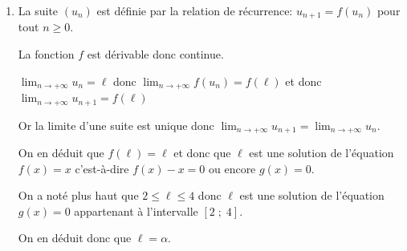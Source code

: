 \documentclass[10pt]{article}
\providecommand{\ds}{\displaystyle}
\begin{document}
\begin{enumerate}
Donc, d'après le corollaire du théorème des valeurs intermédiaires, on peut conclure que l'équation $g(x)=0$ admet une solution unique dans l'intervalle $[2\;;\;4]$.

On appelle $\alpha$ cette solution. À la calculatrice on trouve $\alpha\approx 3,78$.


\item
La suite $(u_n)$ est définie par la relation de récurrence: $u_{n+1}=f\left (u_n\right )$ pour tout $n\geqslant 0$.

La fonction $f$ est dérivable donc continue.

$\ds\lim_{n\to +\infty} u_n=\ell$ donc $\ds\lim_{n\to +\infty} f\left (u_n\right )=f\left (\ell\right )$ et donc $\ds\lim_{n\to +\infty} u_{n+1}=f\left (\ell\right )$

Or la limite d'une suite est unique donc $\ds\lim_{n\to +\infty} u_{n+1}= \ds\lim_{n\to +\infty} u_{n}$.

On en déduit que $f\left (\ell\right ) = \ell$ et donc que $\ell$ est une solution de l'équation $f(x)=x$ c'est-à-dire $f(x)-x=0$ ou encore $g(x)=0$.

On a noté plus haut que $2 \leqslant \ell \leqslant 4$ donc $\ell$ est une solution de l'équation $g(x)=0$ appartenant à l'intervalle $[2\;;\;4]$.

On en déduit donc que $\ell=\alpha$.

\end{enumerate}

\bigskip
\end{document}
